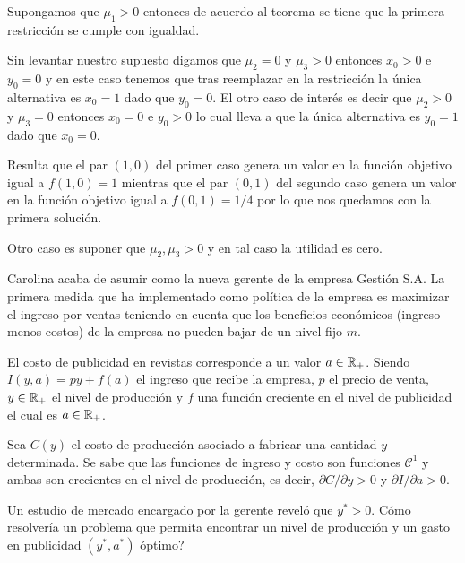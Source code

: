 \begin{solucion}
Supongamos que $\mu_1 > 0$ entonces de acuerdo al teorema se tiene que la primera restricci\'on se cumple con igualdad. 

Sin levantar nuestro supuesto digamos que $\mu_2 = 0$ y $\mu_3 > 0$ entonces $x_0 > 0$ e $y_0 = 0$ y en este caso tenemos que tras reemplazar en la restricci\'on la \'unica alternativa es $x_0 = 1$ dado que $y_0 = 0$. El otro caso de inter\'es es decir que $\mu_2 > 0$ y $\mu_3 = 0$ entonces $x_0 = 0$ e $y_0 > 0$ lo cual lleva a que la \'unica alternativa es $y_0 = 1$ dado que $x_0 = 0$.

Resulta que el par $(1,0)$ del primer caso genera un valor en la funci\'on objetivo igual a $f(1,0) = 1$ mientras que el par $(0,1)$ del segundo caso genera un valor en la funci\'on objetivo igual a $f(0,1) = 1/4$ por lo que nos quedamos con la primera soluci\'on.

Otro caso es suponer que $\mu_2 , \mu_3 > 0$ y en tal caso la utilidad es cero.
\end{solucion}

\begin{ejemplo}\label{ejemplo-gestion}
Carolina acaba de asumir como la nueva gerente de la empresa Gesti\'on S.A. La primera medida que ha implementado como pol\'itica de la empresa es maximizar el ingreso por ventas teniendo en cuenta que los beneficios econ\'omicos (ingreso menos costos) de la empresa no pueden bajar de un nivel fijo $m$. 

El costo de publicidad en revistas corresponde a un valor $a \in \mathbb{R}_+$. Siendo $I(y,a)=py+f(a)$ el ingreso que recibe la empresa, $p$ el precio de venta, $y\in \mathbb{R}_+$ el nivel de producci\'on y $f$ una funci\'on creciente en el nivel de publicidad el cual es $a\in \mathbb{R}_+$. 

Sea $C(y)$ el costo de producci\'on asociado a fabricar una cantidad $y$ determinada. Se sabe que las funciones de ingreso y costo son funciones $\mathcal{C}^1$ y ambas son crecientes en el nivel de producci\'on, es decir, $\partial C / \partial y > 0$ y $\partial I / \partial a > 0$.

Un estudio de mercado encargado por la gerente revel\'o que $y^*>0$. {\textquestiondown}C\'omo resolver\'ia un problema que permita encontrar un nivel de producci\'on y un gasto en publicidad $(y^*,a^*)$ \'optimo?

\end{ejemplo}

